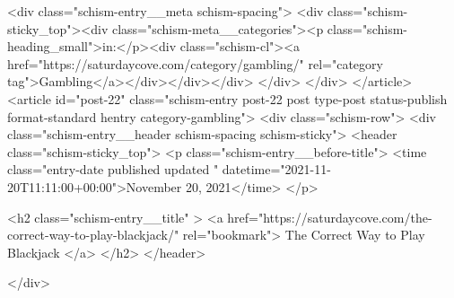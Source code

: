 {		<div class="schism-entry__meta schism-spacing">			<div class="schism-sticky_top"><div class="schism-meta__categories"><p class="schism-heading_small">in:</p><div class="schism-cl"><a href="https://saturdaycove.com/category/gambling/" rel="category tag">Gambling</a></div></div></div>		</div>
	</div>
</article>
<article id="post-22" class="schism-entry post-22 post type-post status-publish format-standard hentry category-gambling">
	<div class="schism-row">		<div class="schism-entry__header schism-spacing schism-sticky">			<header class="schism-sticky_top">				<p class="schism-entry__before-title">
					<time class="entry-date published updated " datetime="2021-11-20T11:11:00+00:00">November 20, 2021</time>				</p>

				<h2 class="schism-entry__title" >
					<a href="https://saturdaycove.com/the-correct-way-to-play-blackjack/" rel="bookmark">
						The Correct Way to Play Blackjack					</a>
				</h2>
			</header>

					</div>

}
